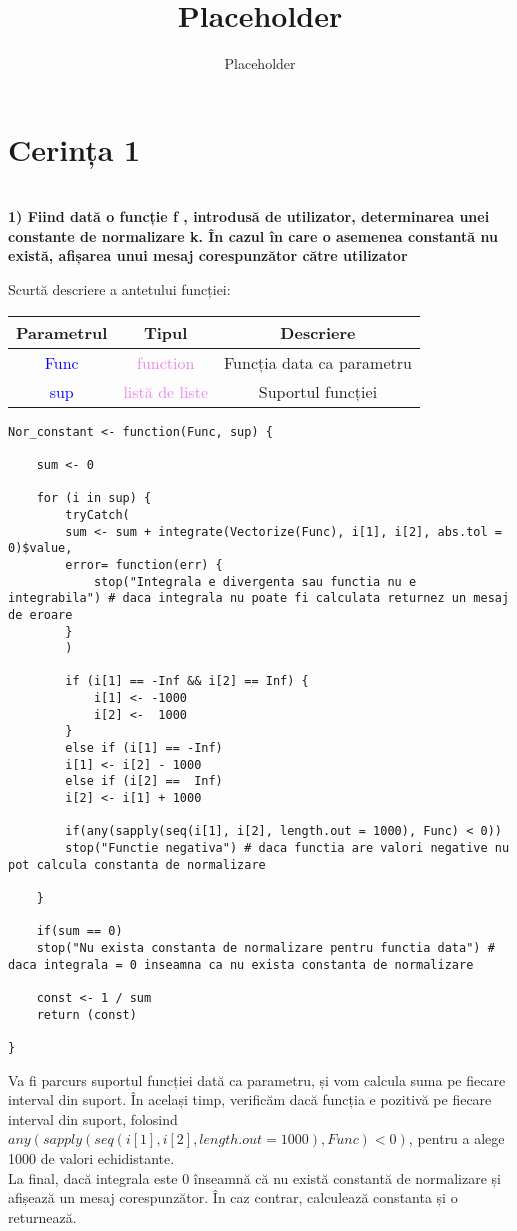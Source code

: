 \documentclass[12pt]{article}
\title{Placeholder}
\author{Placeholder}
\begin{document}
\section{Cerința 1}	\hfill \\
\indent \textbf{1) Fiind dată o funcție f , introdusă de utilizator, determinarea unei constante de
	normalizare k. În cazul în care o asemenea constantă nu există, afișarea unui mesaj
	corespunzător către utilizator}\vspace{5mm}

\indent Scurtă descriere a antetului funcției: \\
\begin{center}
	\begin{tabular}{|| c | c | c ||}
		\hline
		Parametrul & Tipul & Descriere \\
		\hline
		\textcolor{blue}{Func} & \textcolor{violet}{function} & Funcția data ca parametru \\
		\hline
		\textcolor{blue}{sup} & \textcolor{violet}{listă de liste} & Suportul funcției \\
		\hline
	\end{tabular}
\end{center}
\begin{lstlisting}
Nor_constant <- function(Func, sup) {
	
	sum <- 0
	
	for (i in sup) {
		tryCatch(
		sum <- sum + integrate(Vectorize(Func), i[1], i[2], abs.tol = 0)$value,
		error= function(err) {
			stop("Integrala e divergenta sau functia nu e integrabila") # daca integrala nu poate fi calculata returnez un mesaj de eroare
		}
		)
		
		if (i[1] == -Inf && i[2] == Inf) {
			i[1] <- -1000
			i[2] <-  1000
		}
		else if (i[1] == -Inf)
		i[1] <- i[2] - 1000
		else if (i[2] ==  Inf)
		i[2] <- i[1] + 1000
		
		if(any(sapply(seq(i[1], i[2], length.out = 1000), Func) < 0))
		stop("Functie negativa") # daca functia are valori negative nu pot calcula constanta de normalizare
		
	}
	
	if(sum == 0)
	stop("Nu exista constanta de normalizare pentru functia data") # daca integrala = 0 inseamna ca nu exista constanta de normalizare
	
	const <- 1 / sum
	return (const)
	
}
\end{lstlisting}

\indent Va fi parcurs suportul funcției dată ca parametru, și vom calcula suma pe fiecare interval din suport. În același timp, verificăm dacă funcția e pozitivă pe fiecare interval din suport, folosind $any(sapply(seq(i[1], i[2], length.out = 1000), Func) < 0)$, pentru a alege 1000 de valori echidistante.\hfill \\
\indent La final, dacă integrala este 0 înseamnă că nu există constantă de normalizare și afișează un mesaj corespunzător. În caz contrar, calculează constanta și o returnează.\hfill \\
\end{document}
